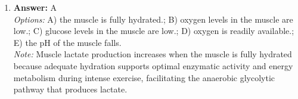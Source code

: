 \documentclass[12pt]{article}
\begin{document}
\begin{enumerate}[label=\arabic*.]
\\ \textit{Note:} The recurrence risk for schizophrenia is greatest for a brother of an affected individual because siblings share approximately 50\% of their genetic material, making them more susceptible to inheriting the genetic risk factors associated with the disorder compared to more distantly related relatives.
\item \textbf{Answer:} A
\\ \textit{Options:} A) the muscle is fully hydrated.; B) oxygen levels in the muscle are low.; C) glucose levels in the muscle are low.; D) oxygen is readily available.; E) the pH of the muscle falls.
\\ \textit{Note:} Muscle lactate production increases when the muscle is fully hydrated because adequate hydration supports optimal enzymatic activity and energy metabolism during intense exercise, facilitating the anaerobic glycolytic pathway that produces lactate.
\end{enumerate}
\end{document}
